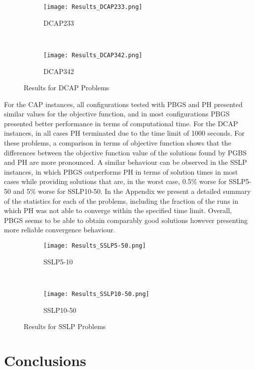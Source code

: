 \documentclass[preprint, 1p, review]{elsarticle}
\begin{document}
\begin{figure}[H]
    \begin{subfigure}[b]{0.5\textwidth}
        \texttt{[image: Results\_DCAP233.png]}
        \caption{DCAP233} 
    \end{subfigure}
    ~
    \begin{subfigure}[b]{0.5\textwidth}
        \texttt{[image: Results\_DCAP342.png]}
        \caption{DCAP342} 
    \end{subfigure}
    \caption{Results for DCAP Problems}      
    \label{Fig:DCAP}
\end{figure}


For the CAP instances, all configurations tested with PBGS and PH presented similar values for the objective function, and in most configurations PBGS presented better performance in terms of computational time. For the DCAP instances, in all cases PH terminated due to the time limit of 1000 seconds. For these problems, a comparison in terms of objective function shows that the differences between the objective function value of the solutions found by PGBS and PH are more pronounced. A similar behaviour can be observed in the SSLP instances, in which PBGS outperforms PH in terms of solution times in most cases while providing solutions that are, in the worst case, 0.5\% worse for SSLP5-50 and 5\% worse for SSLP10-50. In the Appendix we present a detailed summary of the statistics for each of the problems, including the fraction of the runs in which PH was not able to converge within the specified time limit. Overall, PBGS seems to be able to obtain comparably good solutions however presenting more reliable convergence behaviour.  

\begin{figure}[H]
	\begin{subfigure}[b]{0.5\textwidth}
		\texttt{[image: Results\_SSLP5-50.png]}
		\caption{SSLP5-10} 
	\end{subfigure}
	~
	\begin{subfigure}[b]{0.5\textwidth}
		\texttt{[image: Results\_SSLP10-50.png]}
		\caption{SSLP10-50} 
	\end{subfigure}
	\caption{Results for SSLP Problems}
	\label{Fig:SSLP}
\end{figure}


\section{Conclusions} \label{sec6}
\end{document}
